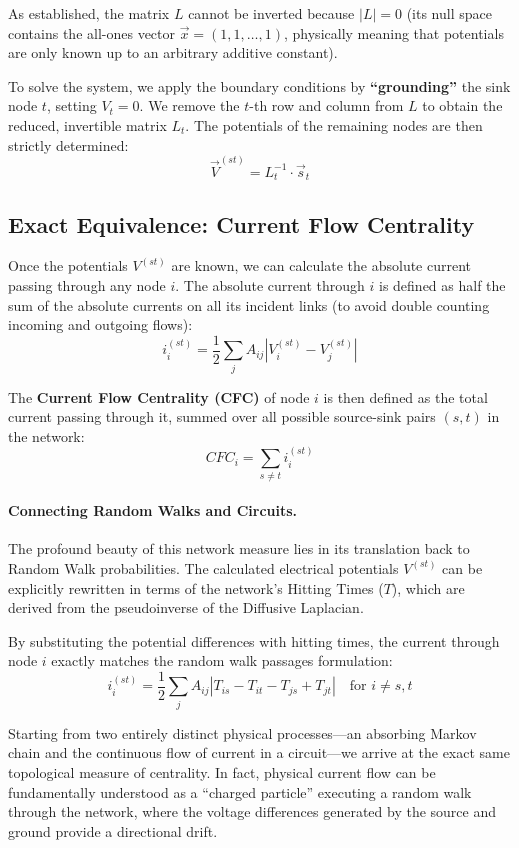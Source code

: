 As established, the matrix $L$ cannot be inverted because $|L| = 0$ (its null space contains the all-ones vector $\vec{x} = (1, 1, \dots, 1)$, physically meaning that potentials are only known up to an arbitrary additive constant).

To solve the system, we apply the boundary conditions by \textbf{``grounding''} the sink node $t$, setting $V_t = 0$. We remove the $t$-th row and column from $L$ to obtain the reduced, invertible matrix $L_t$. The potentials of the remaining nodes are then strictly determined:
\[
    \vec{V}^{(st)} = L_t^{-1} \cdot \vec{s}_t
\]

\subsection{Exact Equivalence: Current Flow Centrality}

Once the potentials $V^{(st)}$ are known, we can calculate the absolute current passing through any node $i$. The absolute current through $i$ is defined as half the sum of the absolute currents on all its incident links (to avoid double counting incoming and outgoing flows):
\[
    i_i^{(st)} = \frac{1}{2} \sum_j A_{ij} |V_i^{(st)} - V_j^{(st)}|
\]

The \textbf{Current Flow Centrality (CFC)} of node $i$ is then defined as the total current passing through it, summed over all possible source-sink pairs $(s, t)$ in the network:
\[
    CFC_i = \sum_{s \neq t} i_i^{(st)}
\]

\paragraph{Connecting Random Walks and Circuits.}
The profound beauty of this network measure lies in its translation back to Random Walk probabilities. The calculated electrical potentials $V^{(st)}$ can be explicitly rewritten in terms of the network's Hitting Times ($T$), which are derived from the pseudoinverse of the Diffusive Laplacian.

By substituting the potential differences with hitting times, the current through node $i$ exactly matches the random walk passages formulation:
\[
    i_i^{(st)} = \frac{1}{2} \sum_j A_{ij} |T_{is} - T_{it} - T_{js} + T_{jt}| \quad \text{for } i \neq s, t
\]

Starting from two entirely distinct physical processes—an absorbing Markov chain and the continuous flow of current in a circuit—we arrive at the exact same topological measure of centrality. In fact, physical current flow can be fundamentally understood as a ``charged particle'' executing a random walk through the network, where the voltage differences generated by the source and ground provide a directional drift.
